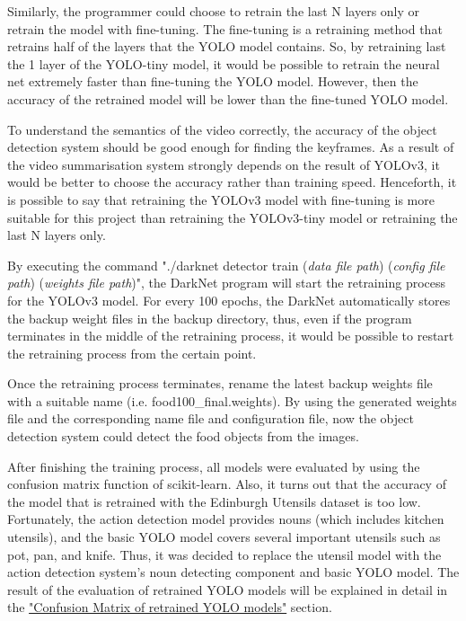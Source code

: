 \documentclass{article}
\begin{document}
Similarly, the programmer could choose to retrain the last N layers only or retrain the model with fine-tuning. The fine-tuning is a retraining method that retrains half of the layers that the YOLO model contains. So, by retraining last the 1 layer of the YOLO-tiny model, it would be possible to retrain the neural net extremely faster than fine-tuning the YOLO model. However, then the accuracy of the retrained model will be lower than the fine-tuned YOLO model.

To understand the semantics of the video correctly, the accuracy of the object detection system should be good enough for finding the keyframes. As a result of the video summarisation system strongly depends on the result of YOLOv3, it would be better to choose the accuracy rather than training speed. Henceforth, it is possible to say that retraining the YOLOv3 model with fine-tuning is more suitable for this project than retraining the YOLOv3-tiny model or retraining the last N layers only.

By executing the command "./darknet detector train (\textit{data file path}) (\textit{config file path}) (\textit{weights file path})", the DarkNet program will start the retraining process for the YOLOv3 model. For every 100 epochs, the DarkNet automatically stores the backup weight files in the backup directory, thus, even if the program terminates in the middle of the retraining process, it would be possible to restart the retraining process from the certain point.

Once the retraining process terminates, rename the latest backup weights file with a suitable name (i.e. food100\_final.weights). By using the generated weights file and the corresponding name file and configuration file, now the object detection system could detect the food objects from the images.

After finishing the training process, all models were evaluated by using the confusion matrix function of scikit-learn. Also, it turns out that the accuracy of the model that is retrained with the Edinburgh Utensils dataset is too low. Fortunately, the action detection model provides nouns (which includes kitchen utensils), and the basic YOLO model covers several important utensils such as pot, pan, and knife. Thus, it was decided to replace the utensil model with the action detection system's noun detecting component and basic YOLO model. The result of the evaluation of retrained YOLO models will be explained in detail in the \hyperlink{evaluate_yolo_with_cm}{"Confusion Matrix of retrained YOLO models"} section.
\end{document}

